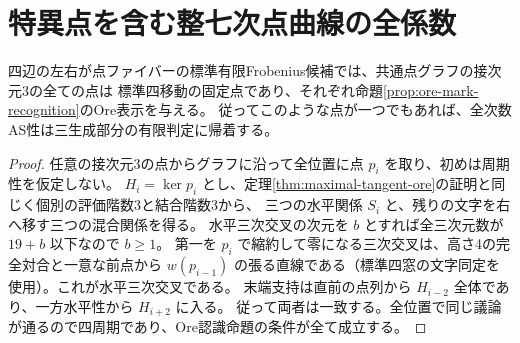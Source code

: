 \section{特異点を含む整七次点曲線の全係数}
\label{sec:integral-septic-boundary}
\begin{proposition}\label{prop:automatic-spatial-tangent-mark}
四辺の左右が点ファイバーの標準有限Frobenius候補では、共通点グラフの接次元3の全ての点は
標準四移動の固定点であり、それぞれ命題\ref{prop:ore-mark-recognition}のOre表示を与える。
従ってこのような点が一つでもあれば、全次数AS性は三生成部分の有限判定に帰着する。
\end{proposition}
\begin{proof}
任意の接次元3の点からグラフに沿って全位置に点 $p_i$ を取り、初めは周期性を仮定しない。
$H_i=\ker p_i$ とし、定理\ref{thm:maximal-tangent-ore}の証明と同じく個別の評価階数3と結合階数3から、
三つの水平関係 $S_i$ と、残りの文字を右へ移す三つの混合関係を得る。
水平三次交叉の次元を $b$ とすれば全三次元数が $19+b$ 以下なので $b\ge1$。
第一を $p_i$ で縮約して零になる三次交叉は、高さ4の完全対合と一意な前点から
$w(p_{i-1})$ の張る直線である（標準四窓の文字同定を使用）。これが水平三次交叉である。
末端支持は直前の点列から $H_{i-2}$ 全体であり、一方水平性から $H_{i+2}$ に入る。
従って両者は一致する。全位置で同じ議論が通るので四周期であり、Ore認識命題の条件が全て成立する。
\end{proof}

